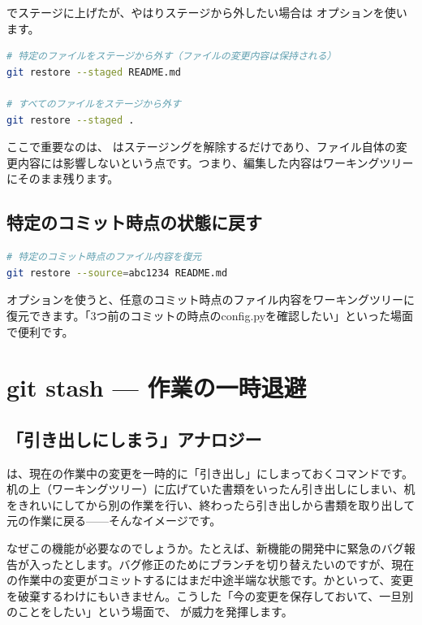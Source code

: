  でステージに上げたが、やはりステージから外したい場合は  オプションを使います。

\begin{lstlisting}[language=bash]
# 特定のファイルをステージから外す（ファイルの変更内容は保持される）
git restore --staged README.md

# すべてのファイルをステージから外す
git restore --staged .
\end{lstlisting}

ここで重要なのは、 はステージングを解除するだけであり、ファイル自体の変更内容には影響しないという点です。つまり、編集した内容はワーキングツリーにそのまま残ります。

\subsection{特定のコミット時点の状態に戻す}

\begin{lstlisting}[language=bash]
# 特定のコミット時点のファイル内容を復元
git restore --source=abc1234 README.md
\end{lstlisting}

 オプションを使うと、任意のコミット時点のファイル内容をワーキングツリーに復元できます。「3つ前のコミットの時点のconfig.pyを確認したい」といった場面で便利です。

\section{git stash — 作業の一時退避}

\subsection{「引き出しにしまう」アナロジー}

 は、現在の作業中の変更を一時的に「引き出し」にしまっておくコマンドです。机の上（ワーキングツリー）に広げていた書類をいったん引き出しにしまい、机をきれいにしてから別の作業を行い、終わったら引き出しから書類を取り出して元の作業に戻る——そんなイメージです。

なぜこの機能が必要なのでしょうか。たとえば、新機能の開発中に緊急のバグ報告が入ったとします。バグ修正のためにブランチを切り替えたいのですが、現在の作業中の変更がコミットするにはまだ中途半端な状態です。かといって、変更を破棄するわけにもいきません。こうした「今の変更を保存しておいて、一旦別のことをしたい」という場面で、 が威力を発揮します。

